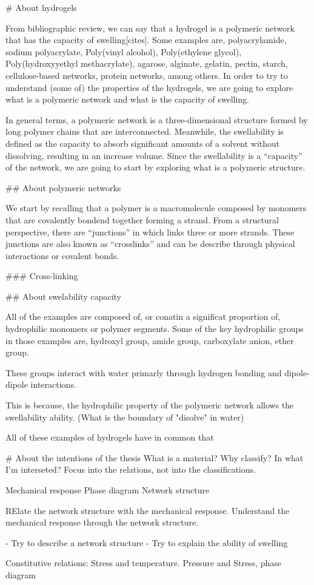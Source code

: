 # About hydrogels

From bibliographic review, we can say that a hydrogel is a polymeric network that has the capacity of swelling[cites].
Some examples are,
    polyacrylamide,
    sodium polyacrylate,
    Poly(vinyl alcohol),
    Poly(ethylene glycol),
    Poly(hydroxyyethyl methacrylate),
    agarose,
    alginate,
    gelatin,
    pectin,
    starch,
    cellulose-based networks,
    protein networks,
    among others.
In order to try to understand (some of) the properties of the hydrogels, we are going to explore what is a polymeric network and what is the capacity of swelling.

In general terms, a polymeric network is a three-dimensional structure formed by long polymer chains that are interconnected.
Meanwhile, the swellability is defined as the capacity to absorb significant amounts of a solvent without dissolving, resulting in an increase volume.
Since the swellability is a ``capacity'' of the network, we are going to start by exploring what is a polymeric structure.

## About polymeric networks

We start by recalling that a polymer is a macromolecule composed by monomers that are covalently bondend together forming a strand.
From a structural perspective, there are ``junctions'' in which links three or more strands.
These junctions are also known as ``crosslinks'' and can be describe through physical interactions or covalent bonds.



### Cross-linking

## About swelability capacity




All of the examples are composed of, or conatin a significat proportion of, hydrophilic monomers or polymer segments.
Some of the key hydrophilic groups in those examples are,
    hydroxyl group,
    amide group,
    carboxylate anion,
    ether group.


These groups interact with water primarly through hydrogen bonding and dipole-dipole interactions.



This is because, the hydrophilic property of the polymeric network allows the swellability ability.
(What is the boundary of "disolve" in water)

All of these examples of hydrogels have in common that 



# About the intentions of the thesis
What is a material?
Why classify?
In what I'm interseted?
Focus into the relations, not into the classifications.

Mechanical response
Phase diagram
Network structure

RElate the network structure with the mechanical response.
Understand the mechanical response through the network structure.

- Try to describe a network structure
- Try to explain the ability of swelling

Constitutive relations: Stress and temperature.
Pressure and Stress, phase diagram


